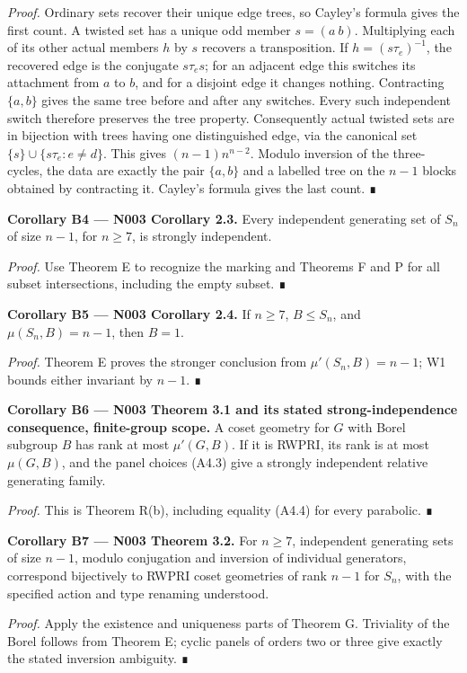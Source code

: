 \documentclass[
  10pt,
  letterpaper,
]{article}
\begin{document}
\emph{Proof.} Ordinary sets recover their unique edge trees, so Cayley's
formula gives the first count. A twisted set has a unique odd member
\(s=(a\ b)\). Multiplying each of its other actual members \(h\) by
\(s\) recovers a transposition. If \(h=(s\tau_e)^{-1}\), the recovered
edge is the conjugate \(s\tau_es\); for an adjacent edge this switches
its attachment from \(a\) to \(b\), and for a disjoint edge it changes
nothing. Contracting \(\{a,b\}\) gives the same tree before and after
any switches. Every such independent switch therefore preserves the tree
property. Consequently actual twisted sets are in bijection with trees
having one distinguished edge, via the canonical set
\(\{s\}\cup\{s\tau_e:e\ne d\}\). This gives \((n-1)n^{n-2}\). Modulo
inversion of the three-cycles, the data are exactly the pair \(\{a,b\}\)
and a labelled tree on the \(n-1\) blocks obtained by contracting it.
Cayley's formula gives the last count. ∎

\textbf{Corollary B4 --- N003 Corollary 2.3.} Every independent
generating set of \(S_n\) of size \(n-1\), for \(n\geq7\), is strongly
independent.

\emph{Proof.} Use Theorem E to recognize the marking and Theorems F and
P for all subset intersections, including the empty subset. ∎

\textbf{Corollary B5 --- N003 Corollary 2.4.} If \(n\geq7\),
\(B\leq S_n\), and \(\mu(S_n,B)=n-1\), then \(B=1\).

\emph{Proof.} Theorem E proves the stronger conclusion from
\(\mu'(S_n,B)=n-1\); W1 bounds either invariant by \(n-1\). ∎

\textbf{Corollary B6 --- N003 Theorem 3.1 and its stated
strong-independence consequence, finite-group scope.} A coset geometry
for \(G\) with Borel subgroup \(B\) has rank at most \(\mu'(G,B)\). If
it is RWPRI, its rank is at most \(\mu(G,B)\), and the panel choices
(A4.3) give a strongly independent relative generating family.

\emph{Proof.} This is Theorem R(b), including equality (A4.4) for every
parabolic. ∎

\textbf{Corollary B7 --- N003 Theorem 3.2.} For \(n\geq7\), independent
generating sets of size \(n-1\), modulo conjugation and inversion of
individual generators, correspond bijectively to RWPRI coset geometries
of rank \(n-1\) for \(S_n\), with the specified action and type renaming
understood.

\emph{Proof.} Apply the existence and uniqueness parts of Theorem G.
Triviality of the Borel follows from Theorem E; cyclic panels of orders
two or three give exactly the stated inversion ambiguity. ∎
\end{document}
